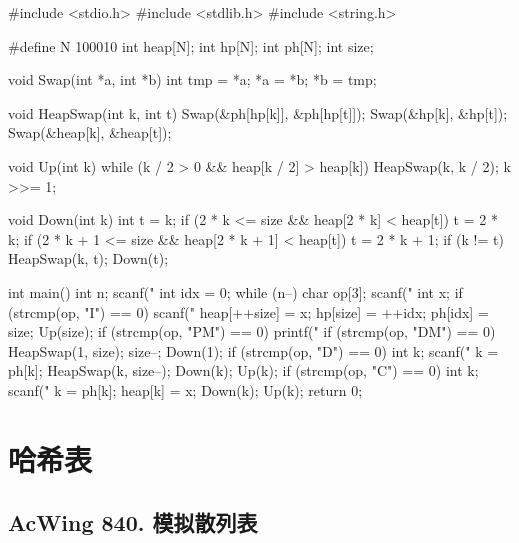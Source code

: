 \begin{mycpptwocol}[可修改任意元素的堆]
#include <stdio.h>
#include <stdlib.h>
#include <string.h>

#define N 100010
int heap[N];
int hp[N];
int ph[N];
int size;

void Swap(int *a, int *b)
{
    int tmp = *a;
    *a = *b;
    *b = tmp;
}

void HeapSwap(int k, int t)
{
    Swap(&ph[hp[k]], &ph[hp[t]]);
    Swap(&hp[k], &hp[t]);
    Swap(&heap[k], &heap[t]);
}

void Up(int k)
{
    while (k / 2 > 0 &&
        heap[k / 2] > heap[k]) {
        HeapSwap(k, k / 2);
        k >>= 1;
    }
}

void Down(int k)
{
    int t = k;
    if (2 * k <= size &&
        heap[2 * k] < heap[t]) {
        t = 2 * k;
    }
    if (2 * k + 1 <= size &&
        heap[2 * k + 1] < heap[t]) {
        t = 2 * k + 1;
    }
    if (k != t) {
        HeapSwap(k, t);
        Down(t);
    }
}

int main()
{
    int n;
    scanf("%
    int idx = 0;
    while (n--) {
        char op[3];
        scanf("%
        int x;
        if (strcmp(op, "I") == 0) {
            scanf("%
            heap[++size] = x;
            hp[size] = ++idx;
            ph[idx] = size;
            Up(size);
        }
        if (strcmp(op, "PM") == 0) {
            printf("%
        }
        if (strcmp(op, "DM") == 0) {
            HeapSwap(1, size);
            size--;
            Down(1);
        }
        if (strcmp(op, "D") == 0) {
            int k;
            scanf("%
            k = ph[k];
            HeapSwap(k, size--);
            Down(k);
            Up(k);
        }
        if (strcmp(op, "C") == 0) {
            int k;
            scanf("%
            k = ph[k];
            heap[k] = x;
            Down(k);
            Up(k);
        }
    }
    return 0;
}
\end{mycpptwocol}

\section{哈希表}
\subsection{AcWing 840. 模拟散列表}

